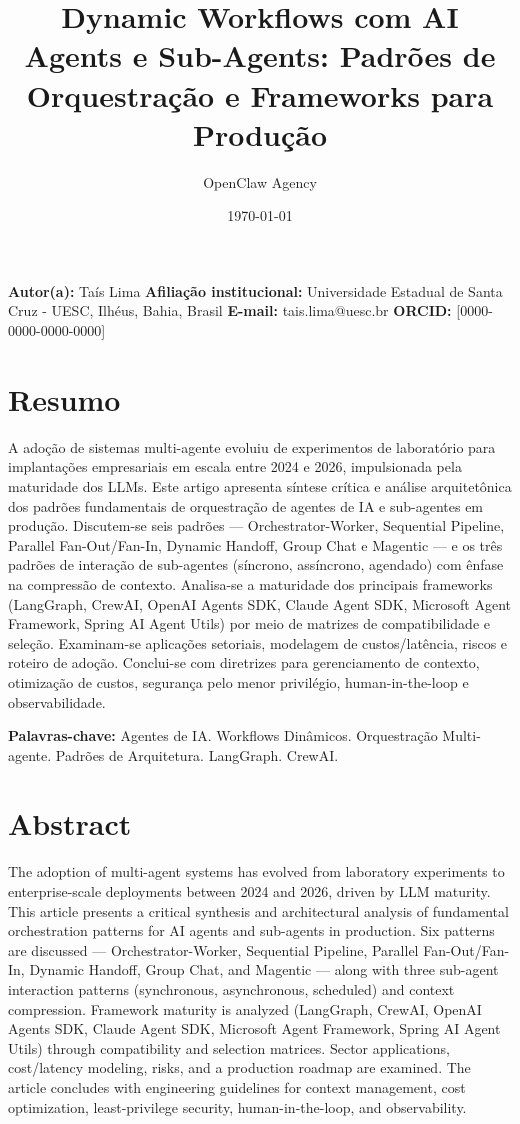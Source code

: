 \documentclass[12pt,a4paper]{article}
\title{Dynamic Workflows com AI Agents e Sub-Agents: Padrões de Orquestração e Frameworks para Produção}
\author{OpenClaw Agency}
\date{\today}
\begin{document}
\maketitle

\textbf{Autor(a):} Taís Lima
\textbf{Afiliação institucional:} Universidade Estadual de Santa Cruz - UESC, Ilhéus, Bahia, Brasil
\textbf{E-mail:} tais.lima@uesc.br
\textbf{ORCID:} [0000-0000-0000-0000]


\section*{Resumo}

A adoção de sistemas multi-agente evoluiu de experimentos de laboratório para implantações empresariais em escala entre 2024 e 2026, impulsionada pela maturidade dos LLMs. Este artigo apresenta síntese crítica e análise arquitetônica dos padrões fundamentais de orquestração de agentes de IA e sub-agentes em produção. Discutem-se seis padrões — Orchestrator-Worker, Sequential Pipeline, Parallel Fan-Out/Fan-In, Dynamic Handoff, Group Chat e Magentic — e os três padrões de interação de sub-agentes (síncrono, assíncrono, agendado) com ênfase na compressão de contexto. Analisa-se a maturidade dos principais frameworks (LangGraph, CrewAI, OpenAI Agents SDK, Claude Agent SDK, Microsoft Agent Framework, Spring AI Agent Utils) por meio de matrizes de compatibilidade e seleção. Examinam-se aplicações setoriais, modelagem de custos/latência, riscos e roteiro de adoção. Conclui-se com diretrizes para gerenciamento de contexto, otimização de custos, segurança pelo menor privilégio, human-in-the-loop e observabilidade.

\textbf{Palavras-chave:} Agentes de IA. Workflows Dinâmicos. Orquestração Multi-agente. Padrões de Arquitetura. LangGraph. CrewAI.


\section*{Abstract}

The adoption of multi-agent systems has evolved from laboratory experiments to enterprise-scale deployments between 2024 and 2026, driven by LLM maturity. This article presents a critical synthesis and architectural analysis of fundamental orchestration patterns for AI agents and sub-agents in production. Six patterns are discussed — Orchestrator-Worker, Sequential Pipeline, Parallel Fan-Out/Fan-In, Dynamic Handoff, Group Chat, and Magentic — along with three sub-agent interaction patterns (synchronous, asynchronous, scheduled) and context compression. Framework maturity is analyzed (LangGraph, CrewAI, OpenAI Agents SDK, Claude Agent SDK, Microsoft Agent Framework, Spring AI Agent Utils) through compatibility and selection matrices. Sector applications, cost/latency modeling, risks, and a production roadmap are examined. The article concludes with engineering guidelines for context management, cost optimization, least-privilege security, human-in-the-loop, and observability.
\end{document}

